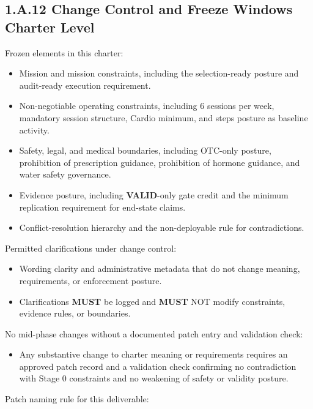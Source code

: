 \documentclass[10pt]{article}
\begin{document}
\subsection*{1.A.12 Change Control and Freeze Windows Charter Level}
{}

Frozen elements in this charter:

\begin{itemize}
\item Mission and mission constraints, including the selection-ready posture and audit-ready execution requirement.
\item Non-negotiable operating constraints, including 6 sessions per week, mandatory session structure, Cardio minimum, and steps posture as baseline activity.
\item Safety, legal, and medical boundaries, including OTC-only posture, prohibition of prescription guidance, prohibition of hormone guidance, and water safety governance.
\item Evidence posture, including \textbf{VALID}-only gate credit and the minimum replication requirement for end-state claims.
\item Conflict-resolution hierarchy and the non-deployable rule for contradictions.
\end{itemize}

Permitted clarifications under change control:

\begin{itemize}
\item Wording clarity and administrative metadata that do not change meaning, requirements, or enforcement posture.
\item Clarifications \textbf{MUST} be logged and \textbf{MUST} NOT modify constraints, evidence rules, or boundaries.
\end{itemize}

No mid-phase changes without a documented patch entry and validation check:

\begin{itemize}
\item Any substantive change to charter meaning or requirements requires an approved patch record and a validation check confirming no contradiction with Stage 0 constraints and no weakening of safety or validity posture.
\end{itemize}

Patch naming rule for this deliverable:
\end{document}
